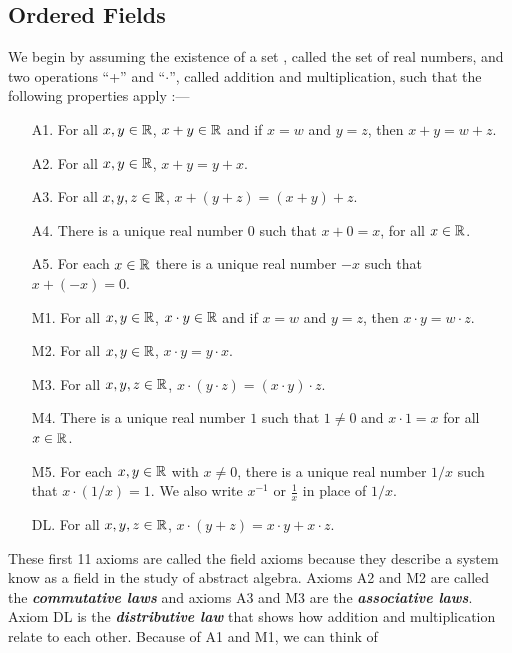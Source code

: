 \documentclass[12pt]{article}
\begin{document}
\subsection{Ordered Fields}
\label{sec:org5321c1a}
\begin{axiom}
  We begin by assuming the existence of a set \Real, called the set of real
  numbers, and two operations ``+'' and ``$\cdot$'', called addition and
  multiplication, such that the following properties apply :---
  \begin{itemize}
  \item [A1. ] For all $x,y \in \mathbb{R}$, $x + y \in \mathbb{R}$ and if $x = w$ and $y
    = z$, then $x + y = w + z$.
  \item [A2. ] For all $x,y \in \mathbb{R}$, $x + y = y + x$.
  \item [A3. ] For all $x,y,z \in \mathbb{R}$, $x + (y + z) = (x + y) + z$.
  \item [A4. ] There is a unique real number $0$ such that $x + 0 = x$, for all
    $x \in \mathbb{R}$.
  \item [A5. ] For each $x \in \mathbb{R}$ there is a unique real number $-x$ such
    that $x + (-x) = 0$.
  \item [M1. ] For all $x,y \in \mathbb{R}$, $x \cdot y \in \mathbb{R}$ and if $x = w$ and
    $y = z$, then $x \cdot y = w \cdot z$.
  \item [M2. ] For all $x,y \in \mathbb{R}$, $x \cdot y = y \cdot x$.
  \item [M3. ] For all $x,y,z \in \mathbb{R}$, $x \cdot (y \cdot z) =(x \cdot y)
    \cdot z$.
  \item [M4. ] There is a unique real number $1$ such that $1 \ne 0$ and $x
    \cdot 1 = x$ for all $x \in \mathbb{R}$.
  \item [M5. ] For each $x,y \in \mathbb{R}$ with $x \ne 0$, there is a unique real
    number $1/x$ such that $x \cdot (1/x) = 1$. We also write $x^{-1}$ or
    $\frac{1}{x}$ in place of $1/x$.
  \item [DL. ] For all $x,y,z \in \mathbb{R}$, $x \cdot (y + z) = x \cdot y + x \cdot
    z$.
  \end{itemize}
  \begin{remark}
    These first 11 axioms are called the field axioms because they describe a
    system know as a field in the study of abstract algebra. Axioms A2 and M2
    are called the \textit{\textbf{commutative laws}} and axioms A3 and M3 are
    the \textit{\textbf{associative laws}}. Axiom DL is the
    \textit{\textbf{distributive law}} that shows how addition and
    multiplication relate to each other. Because of A1 and M1, we can think of

\end{remark}
\end{axiom}
\end{document}
